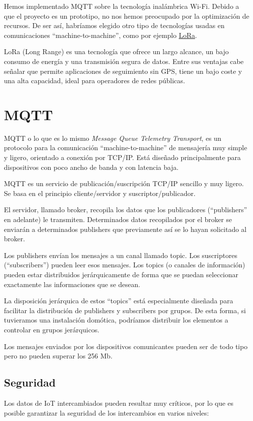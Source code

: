Hemos implementado MQTT sobre la tecnología inalámbrica Wi-Fi. Debido a que el proyecto es un prototipo, no nos hemos preocupado por la optimización de recursos. De ser así, habríamos elegido otro tipo de tecnologías usadas en comunicaciones ``machine-to-machine'', como por ejemplo \href{https://www.lora-alliance.org/What-Is-LoRa/Technology}{LoRa}.

 LoRa (Long Range) es una tecnología que ofrece un largo alcance, un bajo consumo de energía y una transmisión segura de datos. Entre sus ventajas cabe señalar que permite aplicaciones de seguimiento sin GPS, tiene un bajo coste y una alta capacidad, ideal para operadores de redes públicas.

\section{MQTT}
\label{makereference3.2}
MQTT o lo que es lo mismo \textit{Message Queue Telemetry Transport}, es un protocolo para la comunicación ``machine-to-machine'' de mensajería muy simple y ligero, orientado a conexión por TCP/IP. Está diseñado principalmente para dispositivos con poco ancho de banda y con latencia baja.

MQTT es un servicio de publicación/suscripción TCP/IP sencillo y muy ligero. Se basa en el principio cliente/servidor y suscriptor/publicador.

El servidor, llamado broker, recopila los datos que los publicadores (``publishers'' en adelante) le transmiten. Determinados datos recopilados por el broker se enviarán a determinados publishers que previamente así se lo hayan solicitado al broker.

Los publishers envían los mensajes a un canal llamado topic. Los suscriptores (``subscribers'') pueden leer esos mensajes. Los topics (o canales de información) pueden estar distribuidos jerárquicamente de forma que se puedan seleccionar exactamente las informaciones que se desean.

La disposición jerárquica de estos ``topics'' está especialmente diseñada para facilitar la distribución de publishers y subscribers por grupos. De esta forma, si tuvieramos una instalación domótica, podríamos distribuir los elementos a controlar en grupos jerárquicos.

Los mensajes enviados por los dispositivos comunicantes pueden ser de todo tipo pero no pueden superar los 256 Mb.

\subsection{Seguridad}
Los datos de IoT intercambiados pueden resultar muy críticos, por lo que es posible garantizar la seguridad de los intercambios en varios niveles:

